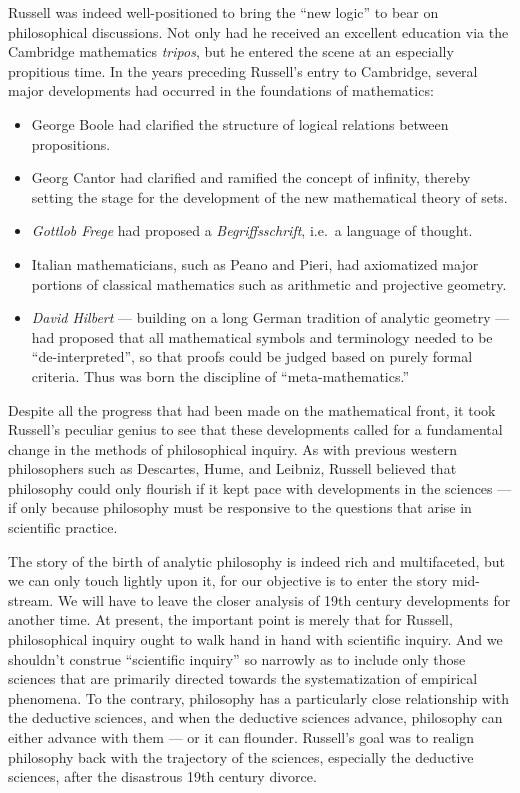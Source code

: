 Russell was indeed well-positioned to bring the ``new logic'' to bear
on philosophical discussions.  Not only had he received an excellent
education via the Cambridge mathematics {\it tripos}, but he entered
the scene at an especially propitious time.  In the years preceding
Russell's entry to Cambridge, several major developments had occurred
in the foundations of mathematics:
\begin{itemize}
\item George Boole had clarified the structure of logical relations
  between propositions.
\item Georg Cantor had clarified and ramified the concept of infinity,
  thereby setting the stage for the development of the new
  mathematical theory of sets.
\item \emph{Gottlob Frege} had proposed a {\it Begriffsschrift}, i.e.\
  a language of thought.
\item Italian mathematicians, such as Peano and Pieri, had axiomatized
  major portions of classical mathematics such as arithmetic and
  projective geometry.
\item \emph{David Hilbert} --- building on a long German tradition of
  analytic geometry --- had proposed that all mathematical symbols and
  terminology needed to be ``de-interpreted'', so that proofs could be
  judged based on purely formal criteria.  Thus was born the
  discipline of ``meta-mathematics.''
\end{itemize}
Despite all the progress that had been made on the mathematical front,
it took Russell's peculiar genius to see that these developments
called for a fundamental change in the methods of philosophical
inquiry.  As with previous western philosophers such as Descartes,
Hume, and Leibniz, Russell believed that philosophy could only
flourish if it kept pace with developments in the sciences --- if only
because philosophy must be responsive to the questions that arise in
scientific practice.

The story of the birth of analytic philosophy is indeed rich and
multifaceted, but we can only touch lightly upon it, for our objective
is to enter the story mid-stream.  We will have to leave the closer
analysis of 19th century developments for another time.  At present,
the important point is merely that for Russell, philosophical inquiry
ought to walk hand in hand with scientific inquiry.  And we shouldn't
construe ``scientific inquiry'' so narrowly as to include only those
sciences that are primarily directed towards the systematization of
empirical phenomena.  To the contrary, philosophy has a particularly
close relationship with the deductive sciences, and when the deductive
sciences advance, philosophy can either advance with them --- or it
can flounder.  Russell's goal was to realign philosophy back with the
trajectory of the sciences, especially the deductive sciences, after
the disastrous 19th century divorce.


